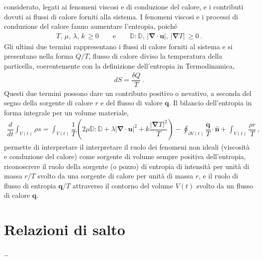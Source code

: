 \documentclass[letterpaper,10pt,italian]{jupyterBook}
\begin{document}
considerato, legati ai fenomeni viscosi e di conduzione del calore, e i
contributi dovuti ai flussi di calore forniti alla sistema. I fenomeni
viscosi e i processi di conduzione del calore fanno aumentare
l’entropia, poiché
\begin{equation*}
\begin{split}T, \, \mu, \, \lambda, \, k \, \geq 0
 \qquad \text{e} \qquad
 \mathbb{D}:\mathbb{D}, \, |\mathbf{\nabla} \cdot \mathbf{u}|, \, |\mathbf{\nabla} T| \, \geq 0 \ .\end{split}
\end{equation*}
\sphinxAtStartPar
Gli ultimi due termini rappresentano i flussi di calore forniti al
sistema e si presentano nella forma \(Q/T\), flusso di calore diviso la
temperatura della particella, coerentemente con la definizione
dell’entropia in Termodinamica,
\begin{equation*}
\begin{split}dS = \dfrac{\delta Q}{T} \ .\end{split}
\end{equation*}
\sphinxAtStartPar
Questi
due termini possono dare un contributo positivo o nevativo, a seconda
del segno della sorgente di calore \(r\) e del flusso di valore \(\mathbf{q}\).
Il bilancio dell’entropia in forma integrale per un volume materiale,
\begin{equation*}
\begin{split}\dfrac{d}{dt}\int_{V(t)} \rho s = \int_{V(t)} \dfrac{1}{T} \left( 2 \mu \mathbb{D} : \mathbb{D} + \lambda |\mathbf{\nabla} \cdot \mathbf{u}|^2 + k \dfrac{|\mathbf{\nabla}T|^2}{T} \right)
 - \oint_{\partial V(t)} \dfrac{\mathbf{q}}{T} \cdot \mathbf{\hat{n}} + \int_{V(t)} \dfrac{\rho r}{T} \ ,\end{split}
\end{equation*}
\sphinxAtStartPar
permette di interpretare il interpretare il ruolo dei fenomeni non
ideali (viscosità e conduzione del calore) come sorgente di volume
sempre positiva dell’entropia, riconoscrere il ruolo della sorgente (o
pozzo) di entropia di intensità per unità di massa \(r/T\) svolto da una
sorgente di calore per unità di massa \(r\), e il ruolo di flusso di
entropia \(\mathbf{q}/T\) attraverso il contorno del volume \(V(t)\) svolto da
un flusso di calore \(\mathbf{q}\).


\section{Relazioni di salto}
\label{\detokenize{polimi/fluidmechanics-ita/template/capitoli/04_bilanci/04teoria:relazioni-di-salto}}\label{\detokenize{polimi/fluidmechanics-ita/template/capitoli/04_bilanci/04teoria:fluid-mechanics-balance-jump}}
\sphinxAtStartPar
…
\end{document}
